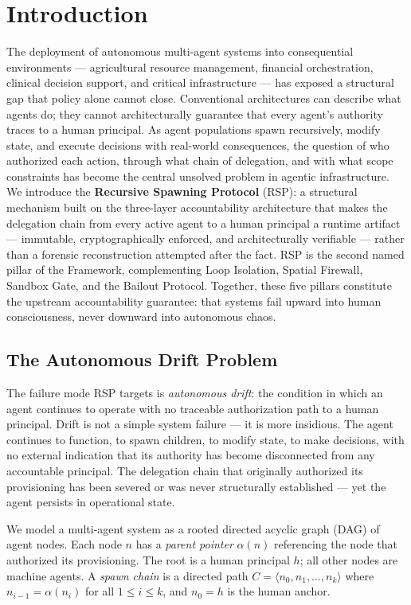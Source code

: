 \section{Introduction}
\label{sec:rs-intro}

The deployment of autonomous multi-agent systems into consequential environments — agricultural resource management, financial orchestration, clinical decision support, and critical infrastructure — has exposed a structural gap that policy alone cannot close. Conventional architectures can describe what agents do; they cannot architecturally guarantee that every agent's authority traces to a human principal. As agent populations spawn recursively, modify state, and execute decisions with real-world consequences, the question of who authorized each action, through what chain of delegation, and with what scope constraints has become the central unsolved problem in agentic infrastructure. We introduce the \textbf{Recursive Spawning Protocol} (RSP): a structural mechanism built on the \bxthree three-layer accountability architecture that makes the delegation chain from every active agent to a human principal a runtime artifact — immutable, cryptographically enforced, and architecturally verifiable — rather than a forensic reconstruction attempted after the fact. RSP is the second named pillar of the \bxthree Framework, complementing Loop Isolation, Spatial Firewall, Sandbox Gate, and the Bailout Protocol. Together, these five pillars constitute the upstream accountability guarantee: that \bxthree systems fail upward into human consciousness, never downward into autonomous chaos.

\subsection{The Autonomous Drift Problem}

The failure mode RSP targets is \emph{autonomous drift}: the condition in which an agent continues to operate with no traceable authorization path to a human principal. Drift is not a simple system failure — it is more insidious. The agent continues to function, to spawn children, to modify state, to make decisions, with no external indication that its authority has become disconnected from any accountable principal. The delegation chain that originally authorized its provisioning has been severed or was never structurally established — yet the agent persists in operational state.

We model a multi-agent system as a rooted directed acyclic graph (DAG) of agent nodes. Each node $n$ has a \emph{parent pointer} $\alpha(n)$ referencing the node that authorized its provisioning. The root is a human principal $h$; all other nodes are machine agents. A \emph{spawn chain} is a directed path $C = \langle n_0, n_1, \ldots, n_k \rangle$ where $n_{i-1} = \alpha(n_i)$ for all $1 \leq i \leq k$, and $n_0 = h$ is the human anchor.

